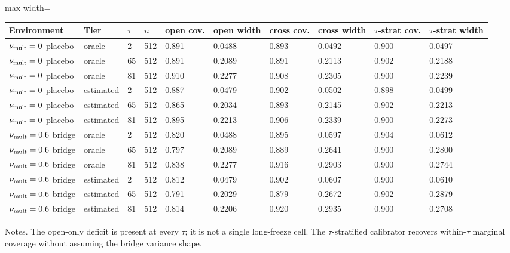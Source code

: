 \begin{table}[!htbp]
\begin{adjustbox}{max width=\linewidth}
\begin{tabular}{@{}llllllllll@{}}
\toprule
Environment & Tier & $\tau$ & $n$ & open cov. & open width & cross cov. & cross width & $\tau$-strat cov. & $\tau$-strat width \\
\midrule
$\nu_{\rm mult}=0$ placebo & oracle & 2 & 512 & 0.891 & 0.0488 & 0.893 & 0.0492 & 0.900 & 0.0497 \\
$\nu_{\rm mult}=0$ placebo & oracle & 65 & 512 & 0.891 & 0.2089 & 0.891 & 0.2113 & 0.902 & 0.2188 \\
$\nu_{\rm mult}=0$ placebo & oracle & 81 & 512 & 0.910 & 0.2277 & 0.908 & 0.2305 & 0.900 & 0.2239 \\
$\nu_{\rm mult}=0$ placebo & estimated & 2 & 512 & 0.887 & 0.0479 & 0.902 & 0.0502 & 0.898 & 0.0499 \\
$\nu_{\rm mult}=0$ placebo & estimated & 65 & 512 & 0.865 & 0.2034 & 0.893 & 0.2145 & 0.902 & 0.2213 \\
$\nu_{\rm mult}=0$ placebo & estimated & 81 & 512 & 0.895 & 0.2213 & 0.906 & 0.2339 & 0.900 & 0.2273 \\
$\nu_{\rm mult}=0.6$ bridge & oracle & 2 & 512 & 0.820 & 0.0488 & 0.895 & 0.0597 & 0.904 & 0.0612 \\
$\nu_{\rm mult}=0.6$ bridge & oracle & 65 & 512 & 0.797 & 0.2089 & 0.889 & 0.2641 & 0.900 & 0.2800 \\
$\nu_{\rm mult}=0.6$ bridge & oracle & 81 & 512 & 0.838 & 0.2277 & 0.916 & 0.2903 & 0.900 & 0.2744 \\
$\nu_{\rm mult}=0.6$ bridge & estimated & 2 & 512 & 0.812 & 0.0479 & 0.902 & 0.0607 & 0.900 & 0.0610 \\
$\nu_{\rm mult}=0.6$ bridge & estimated & 65 & 512 & 0.791 & 0.2029 & 0.879 & 0.2672 & 0.902 & 0.2879 \\
$\nu_{\rm mult}=0.6$ bridge & estimated & 81 & 512 & 0.814 & 0.2206 & 0.920 & 0.2935 & 0.900 & 0.2708 \\
\bottomrule
\end{tabular}
\end{adjustbox}
\vspace{0.5em}
\par\noindent\begin{minipage}{\linewidth}\raggedright{\scriptsize Notes. The open-only deficit is present at every $\tau$; it is not a single long-freeze cell. The $\tau$-stratified calibrator recovers within-$\tau$ marginal coverage without assuming the bridge variance shape.}\end{minipage}\par


\end{table}
